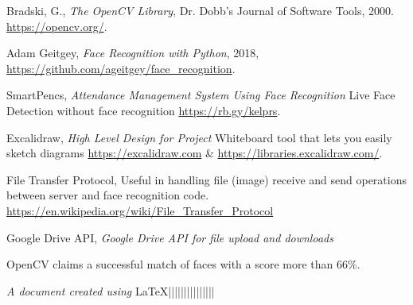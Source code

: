 \documentclass[a4paper,12pt]{article}
\begin{document}
\begin{thebibliography}{9}

Bradski, G., \textit{The OpenCV Library}, Dr. Dobb's Journal of Software Tools, 2000. \url{https://opencv.org/}.

Adam Geitgey, \textit{Face Recognition with Python}, 2018, \url{https://github.com/ageitgey/face_recognition}.

SmartPencs, \textit{Attendance Management System Using Face Recognition} Live Face Detection without face recognition \url{https://rb.gy/kelprs}.

Excalidraw, \textit{High Level Design for Project} Whiteboard tool that lets you easily sketch diagrams
\url{https://excalidraw.com} \& \url{https://libraries.excalidraw.com/}.

File Transfer Protocol, Useful in handling file (image) receive and send operations between server and face recognition code.
\url{https://en.wikipedia.org/wiki/File_Transfer_Protocol}

Google Drive API, \textit{Google Drive API for file upload and downloads} 

OpenCV claims a successful match of faces with a score more than 66\%.

\end{thebibliography}

\vspace{400pt}
\textit{A document created using} \LaTeX ||||||||||||||| \date{\today}
 
\end{document}
